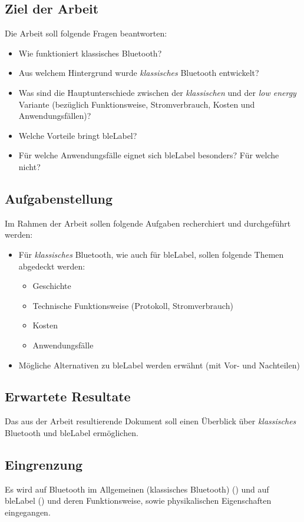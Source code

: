 \subsection{Ziel der Arbeit}
Die Arbeit soll folgende Fragen beantworten:
\begin{itemize}
	\item Wie funktioniert klassisches Bluetooth?
	\item Aus welchem Hintergrund wurde \textit{klassisches} Bluetooth entwickelt?
	\item Was sind die Hauptunterschiede zwischen der \textit{klassischen} und der \textit{low energy} Variante (bezüglich Funktionsweise, Stromverbrauch, Kosten und Anwendungsfällen)?
	\item Welche Vorteile bringt \gls{bleLabel}?
	\item Für welche Anwendungsfälle eignet sich \gls{bleLabel} besonders? Für welche nicht?
\end{itemize}

\subsection{Aufgabenstellung}
Im Rahmen der Arbeit sollen folgende Aufgaben recherchiert und durchgeführt werden:
\begin{itemize}
	\item Für \textit{klassisches} Bluetooth, wie auch für \gls{bleLabel}, sollen folgende Themen abgedeckt werden:
	\begin{itemize}
		\item Geschichte
		\item Technische Funktionsweise (Protokoll, Stromverbrauch)
		\item Kosten
		\item Anwendungsfälle
	\end{itemize}
	\item Mögliche Alternativen zu \gls{bleLabel} werden erwähnt (mit Vor- und Nachteilen)
\end{itemize}

\subsection{Erwartete Resultate}
Das aus der Arbeit resultierende Dokument soll einen Überblick über \textit{klassisches} Bluetooth und \gls{bleLabel} ermöglichen.

\subsection{Eingrenzung}
Es wird auf Bluetooth im Allgemeinen (klassisches Bluetooth) () und auf \gls{bleLabel} () und deren Funktionsweise, sowie physikalischen Eigenschaften eingegangen.

